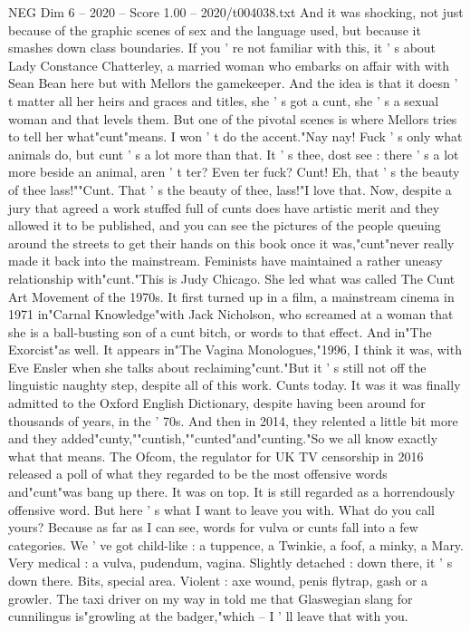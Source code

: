 \begin{textsample}{NEG Dim 6 – 2020 – Score 1.00 – 2020/t004038.txt}
And it was shocking, not just because of the graphic scenes of sex and the language used, but because it smashes down class boundaries.
If you ' re not familiar with this, it ' s about Lady Constance Chatterley, a married woman who embarks on affair with with Sean Bean here but with Mellors the gamekeeper.
And the idea is that it doesn ' t matter all her heirs and graces and titles, she ' s got a cunt, she ' s a sexual woman and that levels them.
But one of the pivotal scenes is where Mellors tries to tell her what"cunt"means.
I won ' t do the accent."Nay nay!
Fuck ' s only what animals do, but cunt ' s a lot more than that.
It ' s thee, dost see : there ' s a lot more beside an animal, aren ' t ter?
Even ter fuck?
Cunt!
Eh, that ' s the beauty of thee lass!""Cunt.
That ' s the beauty of thee, lass!"I love that.
Now, despite a jury that agreed a work stuffed full of cunts does have artistic merit and they allowed it to be published, and you can see the pictures of the people queuing around the streets to get their hands on this book once it was,"cunt"never really made it back into the mainstream.
Feminists have maintained a rather uneasy relationship with"cunt."This is Judy Chicago.
She led what was called The Cunt Art Movement of the 1970s.
It first turned up in a film, a mainstream cinema in 1971 in"Carnal Knowledge"with Jack Nicholson, who screamed at a woman that she is a ball-busting son of a cunt bitch, or words to that effect.
And in"The Exorcist"as well.
It appears in"The Vagina Monologues,"1996, I think it was, with Eve Ensler when she talks about reclaiming"cunt."But it ' s still not off the linguistic naughty step, despite all of this work.
Cunts today.
It was it was finally admitted to the Oxford English Dictionary, despite having been around for thousands of years, in the ' 70s.
And then in 2014, they relented a little bit more and they added"cunty,""cuntish,""cunted"and"cunting."So we all know exactly what that means.
The Ofcom, the regulator for UK TV censorship in 2016 released a poll of what they regarded to be the most offensive words and"cunt"was bang up there.
It was on top.
It is still regarded as a horrendously offensive word.
But here ' s what I want to leave you with.
What do you call yours?
Because as far as I can see, words for vulva or cunts fall into a few categories.
We ' ve got child-like : a tuppence, a Twinkie, a foof, a minky, a Mary.
Very medical : a vulva, pudendum, vagina.
Slightly detached : down there, it ' s down there.
Bits, special area.
Violent : axe wound, penis flytrap, gash or a growler.
The taxi driver on my way in told me that Glaswegian slang for cunnilingus is"growling at the badger,"which -- I ' ll leave that with you.

\end{textsample}
